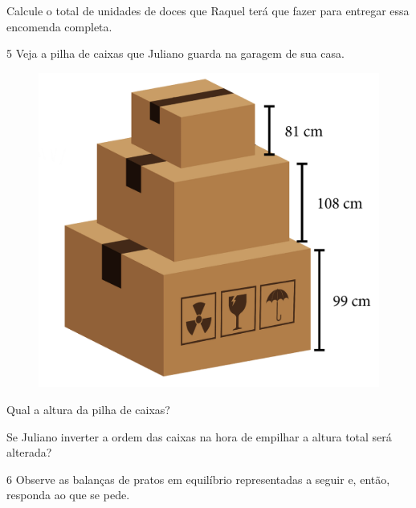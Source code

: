 Calcule o total de unidades de doces que Raquel terá que fazer para entregar essa encomenda completa.


\pagebreak

\num{5} Veja a pilha de caixas que Juliano guarda na garagem de sua casa.

\begin{figure}[htpb!]
\centering
\includegraphics[width=.5\textwidth]{../ilustracoes/MAT5/SAEB_5ANO_MAT_figura19.png}
\end{figure}

\begin{escolha}
\item
  Qual a altura da pilha de caixas?
\item{}
\bigskip

\item
  Se Juliano inverter a ordem das caixas na hora de empilhar a altura
  total será alterada?

\item  {}
\end{escolha}


\num{6} Observe as balanças de pratos em equilíbrio representadas a seguir e, então, responda ao que se pede.

